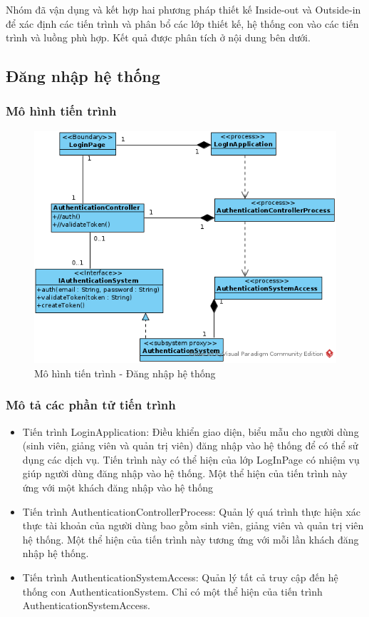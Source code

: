 \documentclass[./../main.tex]{subfiles}
\begin{document}
Nhóm đã vận dụng và kết hợp hai phương pháp thiết kế Inside-out và Outside-in để xác định các tiến trình và phân bổ các lớp thiết kế, hệ thống con vào các tiến trình và luồng phù hợp. Kết quả được phân tích ở nội dung bên dưới.

\subsection{Đăng nhập hệ thống}

\subsubsection{Mô hình tiến trình}

\begin{figure}[H]
	\centering
	\includegraphics[width=\linewidth]{./images/pv_login.png}
\caption{Mô hình tiến trình - Đăng nhập hệ thống}
\end{figure}

\subsubsection{Mô tả các phần tử tiến trình}
\begin{itemize}
	\item Tiến trình LoginApplication: Điều khiển giao diện, biểu mẫu cho người dùng (sinh viên, giảng viên và quản trị viên) đăng nhập vào hệ thống để có thể sử dụng các dịch vụ. Tiến trình này có thể hiện của lớp LogInPage có nhiệm vụ giúp người dùng đăng nhập vào hệ thống.
	      Một thể hiện của tiến trình này ứng với một khách đăng nhập vào hệ thống
	\item Tiến trình AuthenticationControllerProcess: Quản lý quá trình thực hiện xác thực tài khoản của người dùng bao gồm sinh viên, giảng viên và quản trị viên hệ thống.
	      Một thể hiện của tiến trình này tương ứng với mỗi lần khách đăng nhập hệ thống.
	\item Tiến trình AuthenticationSystemAccess: Quản lý tất cả truy cập đến hệ thống con AuthenticationSystem.
	      Chỉ có một thể hiện của tiến trình AuthenticationSystemAccess.
\end{itemize}
\end{document}
